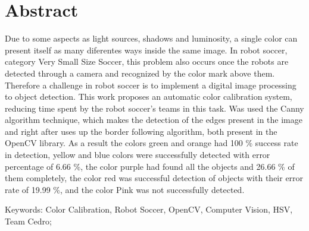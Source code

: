 
\chapter*{Abstract}

Due to some aspects as light sources, shadows and luminosity, a single color can present itself as many diferentes ways inside the same image. In robot soccer, category Very Small Size Soccer, this problem also occurs once the robots are detected through a camera and recognized by the color mark above them. Therefore a challenge in robot soccer is to implement a digital image processing to object detection. This work proposes an automatic color calibration system, reducing time spent by the robot soccer's teams in this task. Was used the Canny algorithm technique, which makes the detection of the edges present in the image and right after uses up the border following algorithm, both present in the OpenCV library. As a result the colors green and orange had 100 \% success rate in detection, yellow and blue colors were successfully detected with error percentage of 6.66 \%, the color purple had found all the objects and 26.66 \% of them completely, the color red was successful detection of objects with their error rate of 19.99 \%, and the color Pink was not successfully detected.

Keywords: Color Calibration, Robot Soccer, OpenCV, Computer Vision, HSV, Team Cedro;